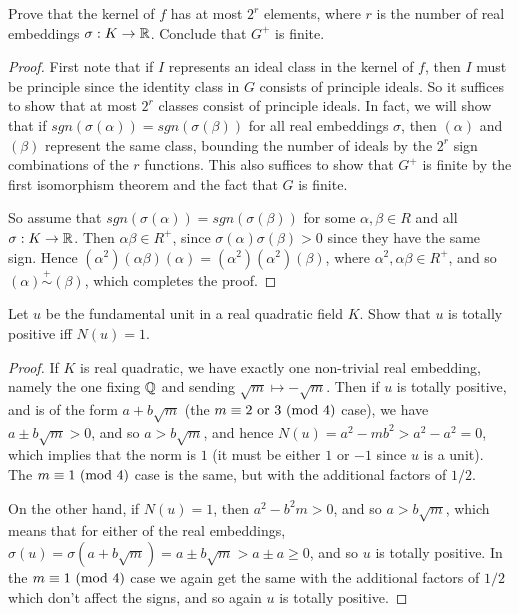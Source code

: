 \documentclass[11pt]{article}
\begin{document}
Prove that the kernel of $f$ has at most $2^r$ elements, where $r$ is the number of real embeddings $\sigma : K \rightarrow \mathbb{R}$.
Conclude that $G^+$ is finite.
\begin{proof}
  First note that if $I$ represents an ideal class in the kernel of $f$, then $I$ must be principle since the identity class in $G$ consists of principle ideals. So it suffices to show that at most $2^r$ classes consist of principle ideals.
  In fact, we will show that if $sgn(\sigma(\alpha)) = sgn(\sigma(\beta))$ for all real embeddings $\sigma$, then $(\alpha)$ and $(\beta)$ represent the same class, bounding the number of ideals by the $2^r$ sign combinations of the $r$ functions.
  This also suffices to show that $G^+$ is finite by the first isomorphism theorem and the fact that $G$ is finite.

  So assume that $sgn(\sigma(\alpha)) = sgn(\sigma(\beta))$ for some $\alpha, \beta \in R$ and all $\sigma : K \rightarrow \mathbb{R}$.
  Then $\alpha\beta \in R^+$, since $\sigma(\alpha)\sigma(\beta) > 0$ since they have the same sign.
  Hence $(\alpha^2)(\alpha\beta)(\alpha) = (\alpha^2)(\alpha^2)(\beta)$, where $\alpha^2, \alpha\beta \in R^+$, and so $(\alpha) \overset{+}{\sim} (\beta)$, which completes the proof.
\end{proof}


Let $u$ be the fundamental unit in a real quadratic field $K$.
Show that $u$ is totally positive iff $N(u) = 1$.
\begin{proof}
  If $K$ is real quadratic, we have exactly one non-trivial real embedding, namely the one fixing $\mathbb{Q}$ and sending $\sqrt{m} \mapsto -\sqrt{m}$.
  Then if $u$ is totally positive, and is of the form $a + b\sqrt{m}$ (the $m \equiv 2 \text{ or } 3\ (\text{mod}\ 4)$ case), we have $a \pm b\sqrt{m} > 0$, and so $a > b \sqrt{m}$, and hence $N(u) = a^2 - mb^2 > a^2 - a^2 = 0$, which implies that the norm is $1$ (it must be either $1$ or $-1$ since $u$ is a unit).
  The $m \equiv 1\ (\text{mod}\ 4)$ case is the same, but with the additional factors of $1/2$.

  On the other hand, if $N(u) = 1$, then $a^2 - b^2m > 0$, and so $a > b\sqrt{m}$, which means that for either of the real embeddings, $\sigma(u) = \sigma(a + b\sqrt{m}) = a \pm b\sqrt{m} > a \pm a \ge 0$, and so $u$ is totally positive. In the $m \equiv 1\ (\text{mod}\ 4)$ case we again get the same with the additional factors of $1/2$ which don't affect the signs, and so again $u$ is totally positive.
\end{proof}
\end{document}
